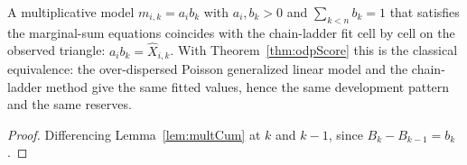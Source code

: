 \begin{theorem}\label{thm:odpUnique}\leanok
{}
A multiplicative model $m_{i,k} = a_i b_k$ with $a_i, b_k > 0$ and $\sum_{k<n} b_k = 1$
that satisfies the marginal-sum equations coincides with the chain-ladder fit cell by
cell on the observed triangle: $a_i b_k = \hat X_{i,k}$. With
Theorem~\ref{thm:odpScore} this is the classical equivalence: the over-dispersed
Poisson generalized linear model and the chain-ladder method give the same fitted
values, hence the same development pattern and the same reserves.
\end{theorem}
\begin{proof}\leanok
Differencing Lemma~\ref{lem:multCum} at $k$ and $k-1$, since
$B_k - B_{k-1} = b_k$.
\end{proof}
